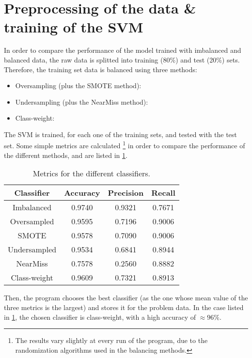 \section{Preprocessing of the data \& training of the SVM}
In order to compare the performance of the model trained with imbalanced and
balanced data, the raw data is splitted into training (80\%) and test (20\%) sets.
Therefore, the training set data is balanced using three methods: 
\begin{itemize}
    \item Oversampling (plus the SMOTE method): 
    \item Undersampling (plus the NearMiss method): 
    \item Class-weight: 
\end{itemize}
The SVM is trained, for each one of the training sets, and tested with the test
set.
Some simple metrics are calculated
\footnote{The results vary slightly at every run of the program, due to the 
randomization algorithms used in the balancing methods.}
in order to compare the performance of the
different methods, and are listed in \cref{tab:metrics}.

\begin{table}[tb!]
    \caption{Metrics for the different classifiers.}
    \label{tab:metrics}
    \centering
    \begin{tabular}{@{}c c c c@{}}
        \toprule
        Classifier   &   Accuracy &   Precision &   Recall  \\
        \midrule

        Imbalanced   &     0.9740 &      0.9321 &   0.7671  \\
        Oversampled  &     0.9595 &      0.7196 &   0.9006  \\
        SMOTE        &     0.9578 &      0.7090 &   0.9006  \\
        Undersampled &     0.9534 &      0.6841 &   0.8944  \\
        NearMiss     &     0.7578 &      0.2560 &   0.8882  \\
        Class-weight &     0.9609 &      0.7321 &   0.8913  \\

        \bottomrule
    \end{tabular}
\end{table}

Then, the program chooses the best classifier (as the one whose mean value of the
three metrics is the largest) and stores it for the problem data.
In the case listed in \cref{tab:metrics}, the chosen classifier is class-weight,
with a high accuracy of $\approx 96\%$.

